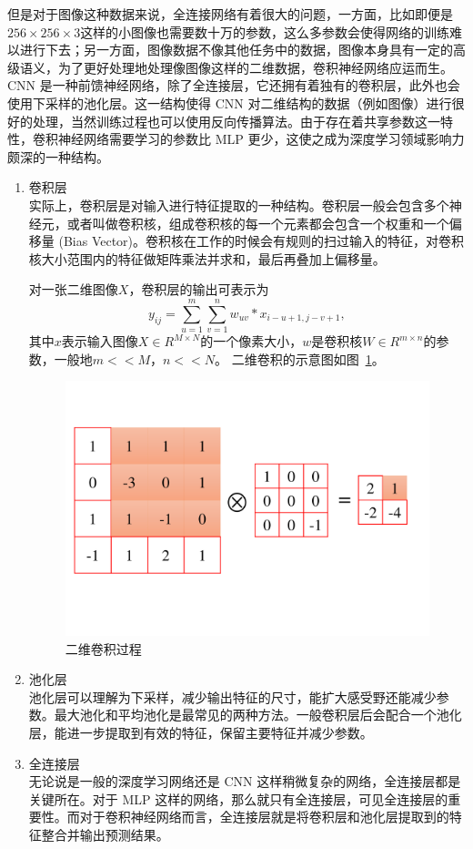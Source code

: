 但是对于图像这种数据来说，全连接网络有着很大的问题，一方面，比如即便是$256 \times 256 \times 3$这样的小图像也需要数十万的参数，这么多参数会使得网络的训练难以进行下去；另一方面，图像数据不像其他任务中的数据，图像本身具有一定的高级语义，为了更好处理地处理像图像这样的二维数据，卷积神经网络应运而生。CNN 是一种前馈神经网络，除了全连接层，它还拥有着独有的卷积层，此外也会使用下采样的池化层。这一结构使得 CNN 对二维结构的数据（例如图像）进行很好的处理，当然训练过程也可以使用反向传播算法\cite{rumelhart1986learning}。由于存在着共享参数这一特性，卷积神经网络需要学习的参数比 MLP 更少，这使之成为深度学习领域影响力颇深的一种结构。

\begin{enumerate}
    \item 卷积层　\\
    实际上，卷积层是对输入进行特征提取的一种结构。卷积层一般会包含多个神经元，或者叫做卷积核，组成卷积核的每一个元素都会包含一个权重和一个偏移量 (Bias Vector)。卷积核在工作的时候会有规则的扫过输入的特征，对卷积核大小范围内的特征做矩阵乘法并求和，最后再叠加上偏移量。
    
    对一张二维图像$X$，卷积层的输出可表示为
    \begin{equation}
        y_{ij} = \sum_{u=1}^{m}\sum_{v=1}^{n}w_{uv} * x_{i-u+1,j-v+1},
    \end{equation}
    其中$x$表示输入图像$X\in{R^{M\times N}}$的一个像素大小，$w$是卷积核$W \in R^{m\times n}$的参数，一般地$m << M$，$n << N$。
    二维卷积的示意图如图~\ref{fig:2dconv}。
    \begin{figure}[htbp]
        \centering
        \includegraphics[width=0.7\linewidth]{figures/2dconv.pdf}
        \caption{二维卷积过程}
        \label{fig:2dconv}
    \end{figure}
    \item 池化层　\\
    池化层可以理解为下采样，减少输出特征的尺寸，能扩大感受野还能减少参数。最大池化和平均池化是最常见的两种方法。一般卷积层后会配合一个池化层，能进一步提取到有效的特征，保留主要特征并减少参数。
    \item 全连接层　\\
    无论说是一般的深度学习网络还是 CNN 这样稍微复杂的网络，全连接层都是关键所在。对于 MLP 这样的网络，那么就只有全连接层，可见全连接层的重要性。而对于卷积神经网络而言，全连接层就是将卷积层和池化层提取到的特征整合并输出预测结果。
\end{enumerate}

